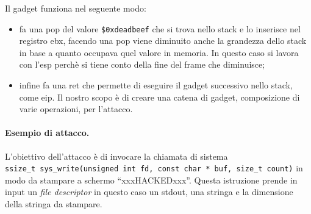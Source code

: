 Il gadget funziona nel seguente modo:
\begin{itemize}
    \item fa una pop del valore \verb|$0xdeadbeef| che si trova nello stack e lo inserisce nel registro ebx, facendo una pop viene diminuito anche la grandezza dello stack in base a quanto occupava quel valore in memoria. In questo caso si lavora con l'esp perchè si tiene conto della fine del frame che diminuisce;
    \item infine fa una ret che permette di eseguire il gadget successivo nello stack, come eip. Il nostro scopo è di creare una catena di gadget, composizione di varie operazioni, per l'attacco.
\end{itemize}

\paragraph{Esempio di attacco.}
L'obiettivo dell'attacco è di invocare la chiamata di sistema \\
\verb|ssize_t sys_write(unsigned int fd, const char * buf, size_t count)|
in modo da stampare a schermo “xxxHACKEDxxx”. Questa istruzione prende in input un \textit{file descriptor} in questo caso un stdout, una stringa e la dimensione della stringa da stampare.

